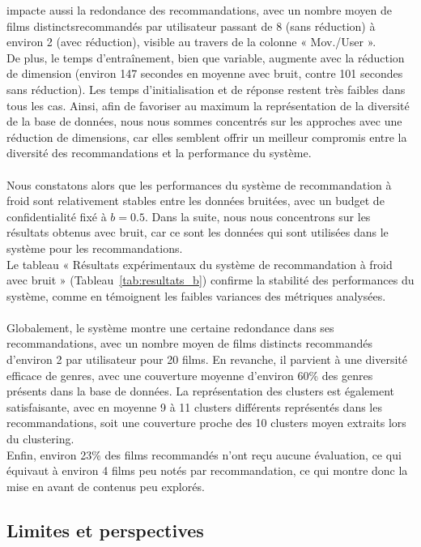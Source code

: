 \documentclass{article}
\begin{document}
impacte aussi la redondance des recommandations, avec un nombre moyen de films distinctsrecommandés par utilisateur passant de 8 (sans réduction) à environ 2 (avec réduction), visible au travers de la colonne « Mov./User ».\\
De plus, le temps d’entraînement, bien que variable, augmente avec la réduction de dimension (environ 147 secondes en moyenne avec bruit, contre 101 secondes sans réduction). Les temps d’initialisation et de réponse restent très faibles dans tous les cas.
Ainsi, afin de favoriser au maximum la représentation de la diversité de la base de données, nous nous sommes concentrés sur les approches avec une réduction de dimensions, car elles semblent offrir un meilleur compromis entre la diversité des recommandations et la performance du système.\\
\\
Nous constatons alors que les performances du système de recommandation à froid sont relativement stables entre les données bruitées, avec un budget de confidentialité fixé à $b = 0.5$.
Dans la suite, nous nous concentrons sur les résultats obtenus avec bruit, car ce sont les données qui sont utilisées dans le système pour les recommandations.\\
Le tableau « Résultats expérimentaux du système de recommandation à froid avec bruit » (Tableau~\ref{tab:resultats_b}) confirme la stabilité des performances
du système, comme en témoignent les faibles variances des métriques analysées.\\
\\
Globalement, le système montre une certaine redondance dans ses recommandations, avec un nombre moyen de films distincts recommandés d’environ 2 par utilisateur pour 20 films. En revanche, il parvient à une
diversité efficace de genres, avec une couverture moyenne d’environ 60\% des genres présents dans la base de données.
La représentation des clusters est également satisfaisante, avec en moyenne 9 à 11 clusters différents représentés dans
les recommandations, soit une couverture proche des 10 clusters moyen extraits lors du clustering.\\
Enfin, environ 23\% des films recommandés n’ont reçu aucune évaluation, ce qui équivaut à environ 4 films peu notés par recommandation, ce qui montre donc la mise en avant de contenus peu explorés.\\

\subsection{Limites et perspectives}
\end{document}
